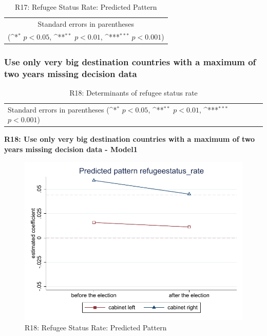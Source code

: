 \documentclass[10pt,a4paper]{scrartcl}
\begin{document}
\begin{table}[!ht]\centering
	\footnotesize
	\renewcommand{\arraystretch}{1.15}
	\def\sym#1{\ifmmode^{#1}\else\(^{#1}\)\fi}
	\caption{R17: Refugee Status Rate: Predicted Pattern}
	\begin{tabular}{l*{2}{c}}
		\hline\hline
		
		\hline\hline
		\multicolumn{3}{c}{\footnotesize Standard errors in parentheses} \\
		\multicolumn{3}{c}{\footnotesize (\sym{*} \(p<0.05\), \sym{**} \(p<0.01\), \sym{***} \(p<0.001\))} \\
	\end{tabular}
\end{table}




\clearpage
\FloatBarrier
\subsubsection{Use only very big destination countries with a maximum of two years missing decision data}
\begin{table}[!ht]\centering
	\renewcommand{\arraystretch}{1.25}
	\small
	\def\sym#1{\ifmmode^{#1}\else\(^{#1}\)\fi}
	\caption{R18: Determinants of refugee status rate}
	\begin{tabular}{l*{3}{c}}
		\hline\hline
		
		\hline\hline
		\multicolumn{4}{l}{\footnotesize Standard errors in parentheses (\sym{*} \(p<0.05\), \sym{**} \(p<0.01\), \sym{***} \(p<0.001\))}\\
	\end{tabular}
\end{table}

\clearpage
\textbf{R18: Use only very big destination countries with a maximum of two years missing decision data - Model1}
\begin{figure}[!ht]
	\centering
	\includegraphics[width=1\textwidth]{figures_edited/refugeestatus_rate_graph1_R18.pdf}
	\caption{R18: Refugee Status Rate: Predicted Pattern}
\end{figure}
\end{document}
